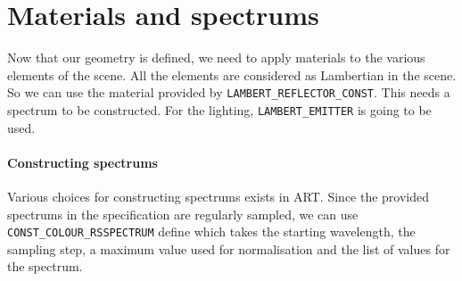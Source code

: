 \documentclass[a4paper,chapterprefix]{scrbook}
\begin{document}
\section{Materials and spectrums}
Now that our geometry is defined, we need to apply materials to the various elements of the scene. All the elements are considered as Lambertian in the scene. So we can use the material provided by \verb?LAMBERT_REFLECTOR_CONST?. This needs a spectrum to be constructed. For the lighting, \verb?LAMBERT_EMITTER? is going to be used.

\paragraph{Constructing spectrums} Various choices for constructing spectrums exists in ART. Since the provided spectrums in the specification are regularly sampled, we can use \verb?CONST_COLOUR_RSSPECTRUM? define which takes the starting wavelength, the sampling step, a maximum value used for normalisation and the list of values for the spectrum.
\end{document}
